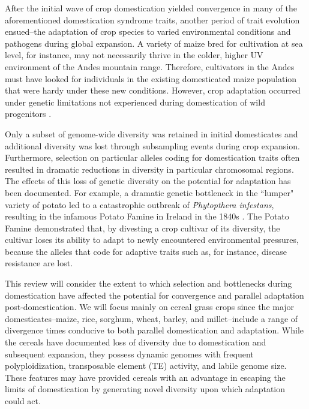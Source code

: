 \documentclass[12pt]{article}
\begin{document}
After the initial wave of crop domestication yielded convergence in many of the aforementioned domestication syndrome traits, another period of trait evolution ensued--the adaptation of crop species to varied environmental conditions and pathogens during global expansion.
A variety of maize bred for cultivation at sea level, for instance, may not necessarily thrive in the colder, higher UV environment of the Andes mountain range.
Therefore, cultivators in the Andes must have looked for individuals in the existing domesticated maize population that were hardy under these new conditions.
However, crop adaptation occurred under genetic limitations not experienced during domestication of wild progenitors \citep{Wang2017}. 

Only a subset of genome-wide diversity was retained in initial domesticates and additional diversity was lost through subsampling events during crop expansion.
Furthermore, selection on particular alleles coding for domestication traits often resulted in dramatic reductions in diversity in particular chromosomal regions.
The effects of this loss of genetic diversity on the potential for adaptation has been documented.
For example, a dramatic genetic bottleneck in the ``lumper" variety of potato led to a catastrophic outbreak of \emph{Phytopthera infestans}, resulting in the infamous Potato Famine in Ireland in the 1840s \citep{Goodwin1994}.
The Potato Famine demonstrated that, by divesting a crop cultivar of its diversity, the cultivar loses its ability to adapt to newly encountered environmental pressures, because the alleles that code for adaptive traits such as, for instance, disease resistance are lost.

This review will consider the extent to which selection and bottlenecks during domestication have affected the potential for convergence and parallel adaptation post-domestication.
We will focus mainly on cereal grass crops since the major domesticates--maize, rice, sorghum, wheat, barley, and millet--include a range of divergence times conducive to both parallel domestication and adaptation.
While the cereals have documented loss of diversity due to domestication and subsequent expansion, they possess dynamic genomes with frequent polyploidization, transposable element (TE) activity, and labile genome size.
These features may have provided cereals with an advantage in escaping the limits of domestication by generating novel diversity upon which adaptation could act.
\paragraph{}
\end{document}
